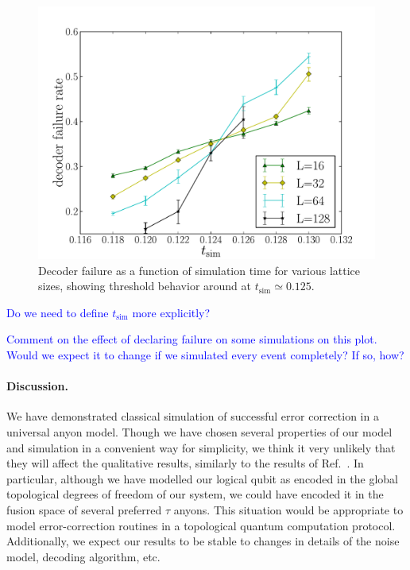 \documentclass[aps, prl, letterpaper, twocolumn, superscriptaddress, notitlepage, 10pt]{revtex4-1}
\newcommand{\cggb}[1]{\textcolor{blue}{#1}}
\begin{document}
\begin{figure}[th!]
\begin{center}
	\includegraphics[width=\columnwidth]{anyons-kyle.pdf}
\caption{Decoder failure as a function of simulation time for various lattice sizes, showing 
threshold behavior around at $t_{\mathrm{sim}}\simeq 0.125$.}
\label{f:threshold}
\end{center}
\end{figure}

\cggb{Do we need to define $t_{\mathrm{sim}}$ more explicitly?}

\cggb{Comment on the effect of declaring failure on some simulations on this plot. Would 
we expect it to change if we simulated every event completely? If so, how?}

\paragraph{Discussion.}

We have demonstrated classical simulation of successful error correction in a universal anyon 
model. Though we have chosen several properties of our model and simulation in a 
convenient way for simplicity, we think it very unlikely that they will affect the qualitative 
results, similarly to the results of Ref.~\cite{Brell2013}. In particular, although we have 
modelled our logical qubit as encoded in the global topological degrees of freedom of our 
system, we could have encoded it in the fusion space of several preferred $\tau$ anyons. 
This situation would be appropriate to model error-correction routines in a topological 
quantum computation protocol. Additionally, we expect our results to be stable to changes 
in details of the noise model, decoding algorithm, etc.
\end{document}
